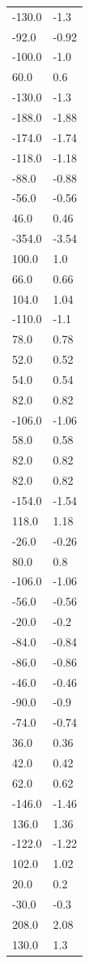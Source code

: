\begin{longtable}{ll}
-130.0 & -1.3 \\
-92.0 & -0.92 \\
-100.0 & -1.0 \\
60.0 & 0.6 \\
-130.0 & -1.3 \\
-188.0 & -1.88 \\
-174.0 & -1.74 \\
-118.0 & -1.18 \\
-88.0 & -0.88 \\
-56.0 & -0.56 \\
46.0 & 0.46 \\
-354.0 & -3.54 \\
100.0 & 1.0 \\
66.0 & 0.66 \\
104.0 & 1.04 \\
-110.0 & -1.1 \\
78.0 & 0.78 \\
52.0 & 0.52 \\
54.0 & 0.54 \\
82.0 & 0.82 \\
-106.0 & -1.06 \\
58.0 & 0.58 \\
82.0 & 0.82 \\
82.0 & 0.82 \\
-154.0 & -1.54 \\
118.0 & 1.18 \\
-26.0 & -0.26 \\
80.0 & 0.8 \\
-106.0 & -1.06 \\
-56.0 & -0.56 \\
-20.0 & -0.2 \\
-84.0 & -0.84 \\
-86.0 & -0.86 \\
-46.0 & -0.46 \\
-90.0 & -0.9 \\
-74.0 & -0.74 \\
36.0 & 0.36 \\
42.0 & 0.42 \\
62.0 & 0.62 \\
-146.0 & -1.46 \\
136.0 & 1.36 \\
-122.0 & -1.22 \\
102.0 & 1.02 \\
20.0 & 0.2 \\
-30.0 & -0.3 \\
208.0 & 2.08 \\
130.0 & 1.3 \\

\end{longtable}
